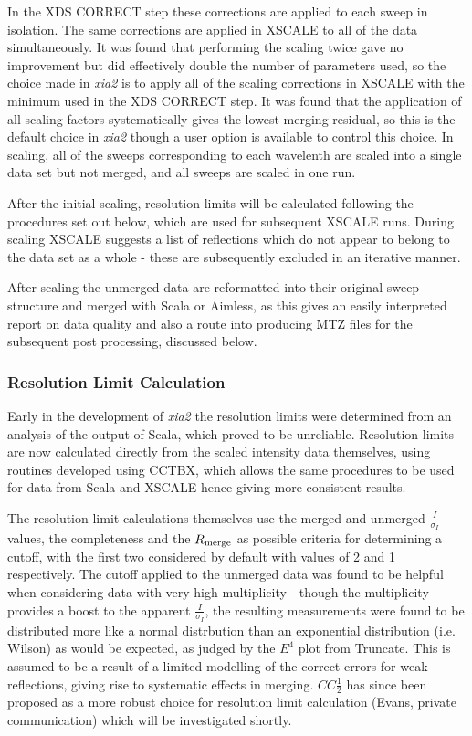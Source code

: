 \documentclass[preprint,pdf]{iucr}
\begin{document}
In the XDS CORRECT step these corrections are applied to each sweep in
isolation. The same corrections are applied in XSCALE to all of the
data simultaneously. It was found that performing the scaling twice
gave no improvement but did effectively double the number of
parameters used, so the choice made in \emph{xia2} is to apply all of
the scaling corrections in XSCALE with the minimum used in the XDS
CORRECT step. It was found that the application of all scaling factors
systematically gives the lowest merging residual, so this is the
default choice in \emph{xia2} though a user option is available to
control this choice. In scaling, all of the sweeps corresponding to
each wavelenth are scaled into a single data set but not merged, and
all sweeps are scaled in one run. 

After the initial scaling, resolution limits will be calculated
following the procedures set out below, which are used for subsequent
XSCALE runs. During scaling XSCALE suggests a
list of reflections which do not appear to belong to the data set as a
whole - these are subsequently excluded in an iterative manner.

After scaling the unmerged data are reformatted into their original
sweep structure and merged with Scala or Aimless, as this gives an
easily interpreted report on data quality and also a route into
producing MTZ files for the subsequent post processing, discussed below.

\subsubsection{Resolution Limit Calculation}

Early in the development of \emph{xia2} the resolution limits were
determined from an analysis of the output of Scala, which proved to be
unreliable. Resolution limits are now calculated directly from the
scaled intensity data themselves, using routines developed using
CCTBX, which allows the same procedures to be used for data from Scala
and XSCALE hence giving more consistent results.

The resolution limit calculations themselves use the merged and
unmerged $\frac{I}{\sigma_I}$ values, the completeness and the
$R_{\rm{merge}}$ as possible criteria for determining a cutoff, with
the first two considered by default with values of 2 and 1
respectively. The cutoff applied to the unmerged data was found to be
helpful when considering data with very high multiplicity - though the
multiplicity provides a boost to the apparent $\frac{I}{\sigma_I}$,
the resulting measurements were found to be distributed more like a
normal distrbution than an exponential distribution (i.e. Wilson) as would be
expected, as judged by the $E^4$ plot from Truncate. This is assumed
to be a result of a limited modelling of the correct errors for weak
reflections, giving rise to systematic effects in
merging. $CC\frac{1}{2}$ has since been proposed as a more robust
choice for resolution limit calculation (Evans, private communication)
which will be investigated shortly.
\end{document}
